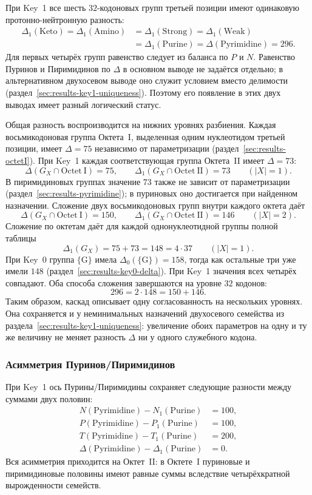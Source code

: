 \documentclass[11pt,a4paper]{article}
\renewcommand{\_}{\origunderscore\allowbreak}
\begin{document}
При Key~1 все шесть $32$-кодоновых групп третьей позиции
имеют одинаковую протонно-нейтронную разность:
\[
\begin{aligned}
\Delta_1(\mathrm{Keto})=\Delta_1(\mathrm{Amino})
&=\Delta_1(\mathrm{Strong})=\Delta_1(\mathrm{Weak})\\
&=\Delta_1(\mathrm{Purine})=\Delta(\mathrm{Pyrimidine})=296.
\end{aligned}
\]
Для первых четырёх групп равенство следует из баланса
по $P$ и $N$. Равенство Пуринов и Пиримидинов по
$\Delta$ в основном выводе не задаётся отдельно;
в альтернативном двухосевом выводе оно служит
условием вместо делимости
(раздел~\ref{sec:results-key1-uniqueness}).
Поэтому его появление в этих двух выводах имеет
разный логический статус.

Общая разность воспроизводится на нижних уровнях
разбиения. Каждая восьмикодоновая группа Октета~I,
выделенная одним нуклеотидом третьей позиции, имеет
$\Delta=75$ независимо от параметризации
(раздел~\ref{sec:results-octetI}). При Key~1 каждая
соответствующая группа Октета~II имеет $\Delta=73$:
\[
\Delta(G_X\cap\mathrm{Octet~I})=75,\qquad
\Delta_1(G_X\cap\mathrm{Octet~II})=73
\qquad (|X|=1).
\]
В пиримидиновых группах значение $73$ также не зависит
от параметризации (раздел~\ref{sec:results-pyrimidine});
в пуриновых оно достигается при найденном назначении.
Сложение двух восьмикодоновых групп внутри каждого
октета даёт
\[
\Delta(G_X\cap\mathrm{Octet~I})=150,\qquad
\Delta_1(G_X\cap\mathrm{Octet~II})=146
\qquad (|X|=2).
\]
Сложение по октетам даёт для каждой однонуклеотидной
группы полной таблицы
\[
\Delta_1(G_X)=75+73=148=4\cdot37
\qquad (|X|=1).
\]
При Key~0 группа $\{\mathrm{G}\}$ имела
$\Delta_0(\{\mathrm{G}\})=158$, тогда как остальные
три уже имели $148$
(раздел~\ref{sec:results-key0-delta}). При Key~1
значения всех четырёх совпадают. Оба способа сложения
завершаются на уровне $32$ кодонов:
\[
296=2\cdot148=150+146.
\]
Таким образом, каскад описывает одну согласованность
на нескольких уровнях. Она сохраняется и у неминимальных
назначений двухосевого семейства из
раздела~\ref{sec:results-key1-uniqueness}: увеличение
обоих параметров на одну и ту же величину не меняет
разность $\Delta$ ни у одного служебного кодона.

\subsubsection{Асимметрия Пуринов/Пиримидинов}
\label{sec:results-key1-purpyr}

При Key~1 ось Пурины/Пиримидины сохраняет следующие
разности между суммами двух половин:
\begin{align*}
N(\mathrm{Pyrimidine})-N_1(\mathrm{Purine})&=100,\\
P(\mathrm{Pyrimidine})-P_1(\mathrm{Purine})&=100,\\
T(\mathrm{Pyrimidine})-T_1(\mathrm{Purine})&=200,\\
\Delta(\mathrm{Pyrimidine})-\Delta_1(\mathrm{Purine})&=0.
\end{align*}
Вся асимметрия приходится на Октет~II: в Октете~I
пуриновые и пиримидиновые половины имеют равные
суммы вследствие четырёхкратной вырожденности семейств.
\end{document}
